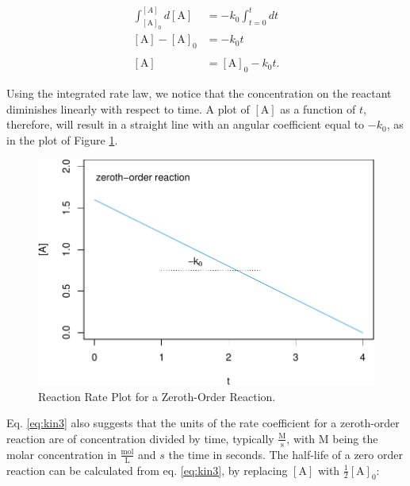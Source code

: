 \documentclass[
  9pt,
]{extbook}
\theoremstyle{definition}
\theoremstyle{definition}
\theoremstyle{definition}
\theoremstyle{definition}
\theoremstyle{remark}
\begin{document}
\begin{equation}
\begin{aligned}
\int_{[\mathrm{A}]_0}^{[A]} d[\mathrm{A}] &= -k_0 \int_{t=0}^{t} dt \\
[\mathrm{A}]-[\mathrm{A}]_0 &= -k_0 t \\ \\
[\mathrm{A}]&=[\mathrm{A}]_0 -k_0 t.
\end{aligned}
\label{eq:kin3}
\end{equation}

Using the integrated rate law, we notice that the concentration on the reactant diminishes linearly with respect to time. A plot of \([\mathrm{A}]\) as a function of \(t\), therefore, will result in a straight line with an angular coefficient equal to \(-k_0\), as in the plot of Figure \ref{fig:figk1}.

\begin{figure}

{\centering \includegraphics{pchem1_files/figure-latex/figk1-1} 

}

\caption{Reaction Rate Plot for a Zeroth-Order Reaction.}\label{fig:figk1}
\end{figure}

Eq. \eqref{eq:kin3} also suggests that the units of the rate coefficient for a zeroth-order reaction are of concentration divided by time, typically \(\frac{\mathrm{M}}{\mathrm{s}}\), with \(\mathrm{M}\) being the molar concentration in \(\frac{\mathrm{mol}}{\mathrm{L}}\) and \(s\) the time in seconds.
The half-life of a zero order reaction can be calculated from eq. \eqref{eq:kin3}, by replacing \([\mathrm{A}]\) with \(\frac{1}{2}[\mathrm{A}]_0\):
\end{document}
